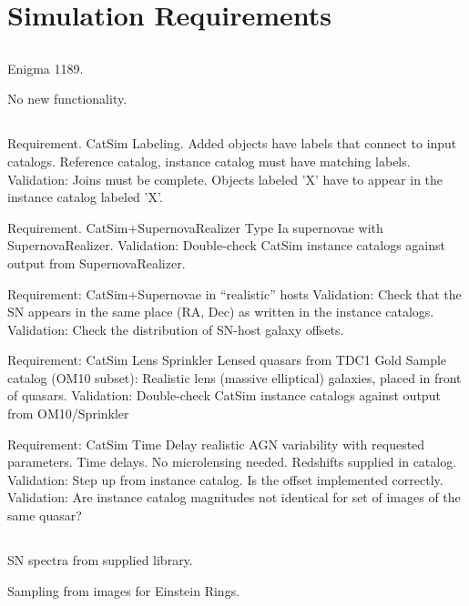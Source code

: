 \section{Simulation Requirements}
\label{sec:twinkles1:simulations}



\subsection{\OpSim}

Enigma 1189.

No new functionality.


\subsection{\CatSim}

Requirement.  CatSim Labeling.
Added objects have labels that connect to input catalogs.  Reference catalog, instance catalog must have matching labels.
Validation:  Joins must be complete.  Objects labeled 'X' have to appear in the instance catalog labeled 'X'.

Requirement.  CatSim+SupernovaRealizer
Type Ia supernovae with SupernovaRealizer. 
Validation:  Double-check CatSim instance catalogs against output from SupernovaRealizer.

Requirement:  CatSim+Supernovae in ``realistic'' hosts 
Validation:  Check that the SN appears in the same place (RA, Dec) as written in the instance catalogs.
Validation:  Check the distribution of SN-host galaxy offsets.

Requirement:  CatSim Lens Sprinkler
Lensed quasars from TDC1 Gold Sample catalog (OM10 subset):
Realistic lens (massive elliptical) galaxies, placed in front of quasars.
Validation:  Double-check CatSim instance catalogs against output from OM10/Sprinkler

Requirement:  CatSim Time Delay
realistic AGN variability with requested parameters. Time delays.
No microlensing needed. Redshifts supplied in catalog.
Validation:  Step up from instance catalog.  Is the offset implemented correctly.
Validation:  Are instance catalog magnitudes not identical for set of images of the same quasar?



\subsection{\PhoSim}

SN spectra from supplied library.

Sampling from images for Einstein Rings.


